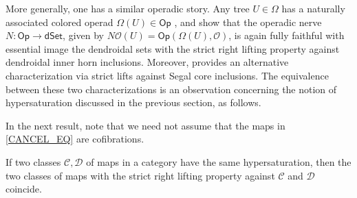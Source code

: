 \documentclass[a4paper,10pt
]{article}%
\begin{document}
More generally, 
one has a similar operadic story. Any tree $U \in \Omega$ has a naturally associated colored operad 
$\Omega(U) \in \mathsf{Op}$ \cite[\S 3]{MW07}, and
\cite[Prop. 5.3 and Thm. 6.1]{MW09} show that the operadic nerve
$N \colon \mathsf{Op} \to \mathsf{dSet}$, 
given by $N\mathcal{O} (U) = \mathsf{Op}(\Omega(U), \mathcal {O})$,
is again fully faithful
with essential image the dendroidal sets with the strict right lifting property against dendroidal inner horn inclusions.
Moreover, \cite[Cor. 2.6]{CM13a} provides an alternative characterization via strict lifts against Segal core inclusions. The equivalence between these two characterizations is an observation concerning the notion of hypersaturation discussed in the previous section, as follows.


In the next result, note that we need not assume that the maps in
\eqref{CANCEL_EQ} are cofibrations.

\begin{proposition}\label{HYPERLP PROP}
      If two classes $\mathcal{C},\mathcal{D}$
      of maps in a category
      have the same hypersaturation, then
      the two classes of maps with the strict right lifting property against $\mathcal C$ and $\mathcal D$ coincide.
\end{proposition}
\end{document}
